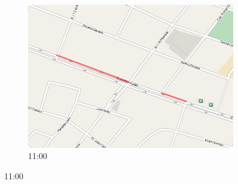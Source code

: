 \begin{figure}[!htbp]
\begin{subfigure}[b]{0.30\textwidth}
		\includegraphics[width=\textwidth]{capitulos/7/figuras/11.jpg}
		\caption{11:00}
	\end{subfigure}
	

\end{figure}
